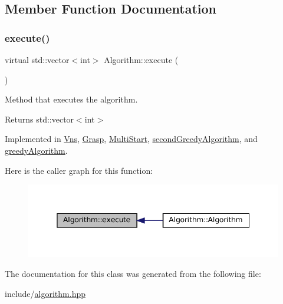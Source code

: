 \subsection{Member Function Documentation}
\mbox{\label{classAlgorithm_af6ea9eb9a6dbd41896e3fd7dabac096b}} 
\subsubsection{\texorpdfstring{execute()}{execute()}}
{\footnotesize\ttfamily virtual std\+::vector$<$int$>$ Algorithm\+::execute (\begin{DoxyParamCaption}{ }\end{DoxyParamCaption})\hspace{0.3cm}{\ttfamily [pure virtual]}}



Method that executes the algorithm. 

\begin{DoxyReturn}{Returns}
std\+::vector$<$int$>$ 
\end{DoxyReturn}


Implemented in \hyperlink{classVns_aece2ea2cb74dd3608570321fcbb2de0c}{Vns}, \hyperlink{classGrasp_a335b063bccd26b434dda3a3a69d6d711}{Grasp}, \hyperlink{classMultiStart_a9d842b1f602c4b8a47bf6d88d483ccae}{Multi\+Start}, \hyperlink{classsecondGreedyAlgorithm_a119a730116003d00438179ccf4e2cafd}{second\+Greedy\+Algorithm}, and \hyperlink{classgreedyAlgorithm_a37c81600b24a32ae25b6f0eeab643a7a}{greedy\+Algorithm}.

Here is the caller graph for this function\+:\nopagebreak
\begin{figure}[H]
\begin{center}
\leavevmode
\includegraphics[width=345pt]{classAlgorithm_af6ea9eb9a6dbd41896e3fd7dabac096b_icgraph}
\end{center}
\end{figure}


The documentation for this class was generated from the following file\+:\begin{DoxyCompactItemize}
\item 
include/\hyperlink{algorithm_8hpp}{algorithm.\+hpp}\end{DoxyCompactItemize}
